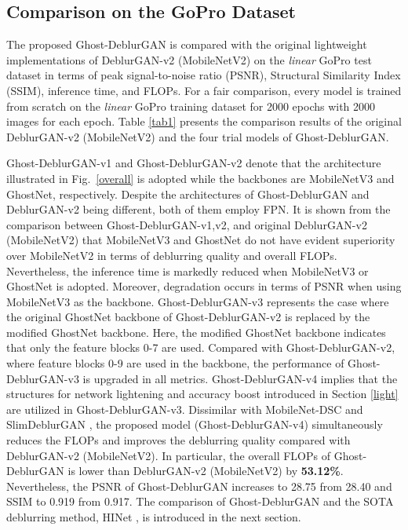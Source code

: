 \documentclass[letterpaper, 10 pt, conference]{ieeeconf}
\begin{document}
\subsection{Comparison on the GoPro Dataset}
The proposed Ghost-DeblurGAN is compared with the original lightweight implementations of DeblurGAN-v2 (MobileNetV2) \cite{deblurgan2} on the \textit{linear} GoPro test dataset \cite{deblurgan2,nah} in terms of peak signal-to-noise ratio (PSNR), Structural Similarity Index (SSIM), inference time, and FLOPs. For a fair comparison, every model is trained from scratch on the \textit{linear} GoPro training dataset \cite{deblurgan2,nah} for 2000 epochs with 2000 images for each epoch. Table \ref{tab1} presents the comparison results of the original DeblurGAN-v2 (MobileNetV2) \cite{deblurgan2} and the four trial models of Ghost-DeblurGAN.

Ghost-DeblurGAN-v1 and Ghost-DeblurGAN-v2 denote that the architecture illustrated in Fig.~\ref{overall} is adopted while the backbones are MobileNetV3 and GhostNet, respectively.  Despite the architectures of Ghost-DeblurGAN and DeblurGAN-v2 being different, both of them employ FPN. It is shown from the comparison between Ghost-DeblurGAN-v1,v2, and original DeblurGAN-v2 (MobileNetV2) that MobileNetV3 and GhostNet do not have evident superiority over MobileNetV2 in terms of deblurring quality and overall FLOPs. Nevertheless, the inference time is markedly reduced when MobileNetV3 or GhostNet is adopted. Moreover, degradation occurs in terms of PSNR when using MobileNetV3 as the backbone. Ghost-DeblurGAN-v3 represents the case where the original GhostNet backbone of  Ghost-DeblurGAN-v2 is replaced by the modified GhostNet backbone. Here, the modified  GhostNet backbone indicates that only the feature blocks 0-7 are used. Compared with Ghost-DeblurGAN-v2, where feature blocks 0-9 are used in the backbone, the performance of Ghost-DeblurGAN-v3 is upgraded in all metrics. Ghost-DeblurGAN-v4 implies that the structures for network lightening and accuracy boost introduced in Section \ref{light} are utilized in Ghost-DeblurGAN-v3. Dissimilar with MobileNet-DSC \cite{deblurgan2} and SlimDeblurGAN \cite{truong2020slimdeblurgan}, the proposed model (Ghost-DeblurGAN-v4) simultaneously reduces the FLOPs and improves the deblurring quality compared with DeblurGAN-v2 (MobileNetV2). In particular, the overall FLOPs of Ghost-DeblurGAN is lower than DeblurGAN-v2 (MobileNetV2) by \textbf{53.12\%}. Nevertheless, the PSNR of Ghost-DeblurGAN increases to 28.75 from 28.40 and SSIM to 0.919 from 0.917. The comparison of Ghost-DeblurGAN and the SOTA deblurring method, HINet \cite{chen2021hinet}, is introduced in the next section.
\end{document}
